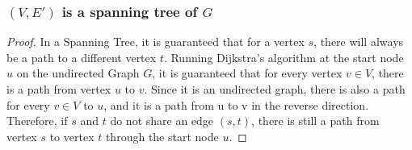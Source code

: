 \documentclass{article}
\theoremstyle{definition}
\theoremstyle{remark}
\theoremstyle{plain}
\begin{document}
\subsubsection{$(V, E')$ is a spanning tree of $G$}
\begin{proof}
In a Spanning Tree, it is guaranteed that for a vertex $s$, there will always be a path to a different vertex $t$.
Running Dijkstra's algorithm at the start node $u$ on the undirected Graph $G$, it is guaranteed that for every vertex $v \in V$, there is a path from vertex $u$ to $v$. Since it is an undirected graph, there is also a path for every $v \in V$ to $u$, and it is a path from u to v in the reverse direction.\\
Therefore, if $s$ and $t$ do not share an edge $(s,t)$, there is still a path from vertex $s$ to vertex $t$ through the start node $u$.
\end{proof}
\end{document}
